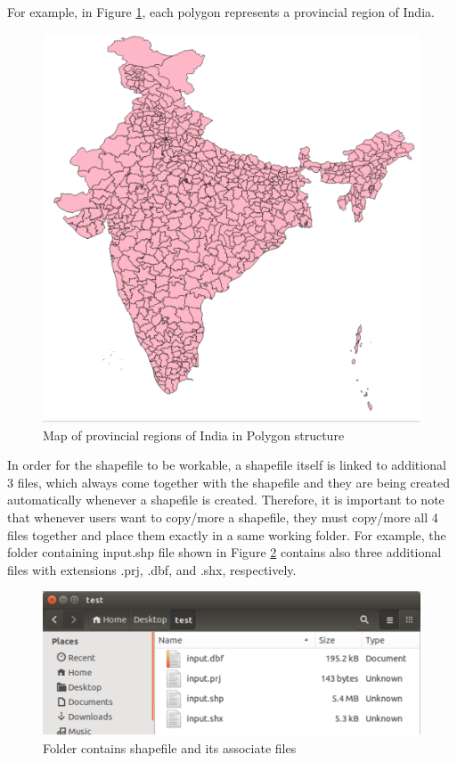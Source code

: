 \documentclass[12pt,oneside]{memoir}
\begin{document}
For example, in Figure \ref{indianmap}, each polygon represents a provincial region of India. 

\begin{figure}[H]
\centering
\includegraphics[scale=0.3]{indianmap} 
\caption{Map of provincial regions of India in Polygon structure} 
\label{indianmap}
\end{figure}

In order for the shapefile to be workable, a shapefile itself is linked to additional 3 files, which always come together with the shapefile and they are being created automatically whenever a shapefile is created. Therefore, it is important to note that whenever users want to copy/more a shapefile, they must copy/more all 4 files together and place them exactly in a same working folder. For example, the folder containing input.shp file shown in Figure \ref{inputshapefile} contains also three additional files with extensions .prj, .dbf, and .shx, respectively. 

\begin{figure}[H]
\centering
\includegraphics[scale=0.5]{inputshapefile} 
\caption{Folder contains shapefile and its associate files} 
\label{inputshapefile}
\end{figure}
\end{document}
